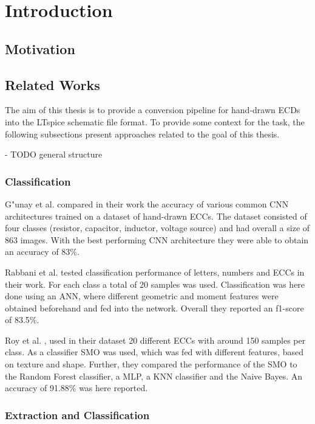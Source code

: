 \chapter{Introduction}

\section{Motivation}

\section{Related Works}

The aim of this thesis is to provide a conversion pipeline for hand-drawn \acp{ECD} into the LTspice schematic file format.
To provide some context for the task, the following subsections present approaches related to the goal of this thesis.

- TODO general structure

\subsection{Classification}

G"unay et al. \cite{ecd_basecnn} compared in their work the accuracy of various common \ac{CNN} architectures trained on a dataset of hand-drawn \acp{ECC}.
The dataset consisted of four classes (resistor, capacitor, inductor, voltage source) and had overall a size of 863 images.
With the best performing \ac{CNN} architecture they were able to obtain an accuracy of 83\%.

Rabbani et al. \cite{ecd_anngeo} tested classification performance of letters, numbers and \acp{ECC} in their work.
For each class a total of 20 samples was used.
Classification was here done using an \ac{ANN}, where different geometric and moment features were obtained beforehand and fed into the network.
Overall they reported an f1-score of 83.5\%.

Roy et al. \cite{ecd_texturesmo}, used in their dataset 20 different \acp{ECC} with around 150 samples per class.
As a classifier \ac{SMO} was used, which was fed with different features, based on texture and shape.
Further, they compared the performance of the \ac{SMO} to the Random Forest classifier, a \ac{MLP}, a \ac{KNN} classifier and the Naive Bayes.
An accuracy of 91.88\% was here reported.


\subsection{Extraction and Classification}

